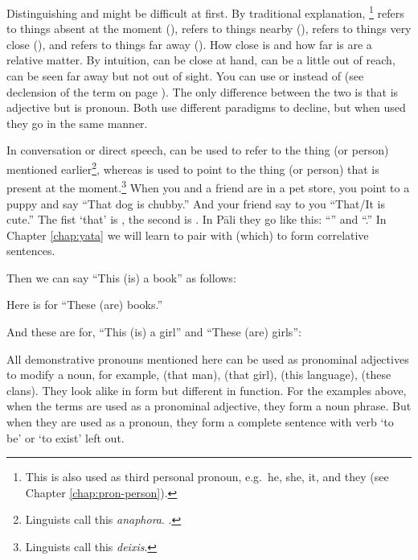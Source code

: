 Distinguishing  and  might be difficult at first. By traditional explanation, \footnote{This is also used as third personal pronoun, e.g.\ he, she, it, and they (see Chapter \ref{chap:pron-person}).} refers to things absent at the moment (),  refers to things nearby (),  refers to things very close (), and  refers to things far away (). How close is  and how far is  are a relative matter. By intuition,  can be close at hand,  can be a little out of reach,  can be seen far away but not out of sight. You can use  or  instead of  (see declension of the term on page \pageref{decl:asuka}). The only difference between the two is that  is adjective but  is pronoun. Both use different paradigms to decline, but when used they go in the same manner.

In conversation or direct speech,  can be used to refer to the thing (or person) mentioned earlier\footnote{Linguists call this \emph{anaphora}. \citealp[See also][p.~29]{warder:intro}.}, whereas  is used to point to the thing (or person) that is present at the moment.\footnote{Linguists call this \emph{deixis}.} When you and a friend are in a pet store, you point to a puppy and say ``That dog is chubby.'' And your friend say to you ``That/It is cute.'' The fist `that' is , the second is . In P\=ali they go like this: ``'' and ``.'' In Chapter \ref{chap:yata} we will learn to pair  with  (which) to form correlative sentences.

Then we can say ``This (is) a book'' as follows:


Here is for ``These (are) books.''


And these are for, ``This (is) a girl'' and ``These (are) girls'':


All demonstrative pronouns mentioned here can be used as pronominal adjectives to modify a noun, for example,  (that man),  (that girl),  (this language),  (these clans). They look alike in form but different in function. For the examples above, when the terms are used as a pronominal adjective, they form a noun phrase. But when they are used as a pronoun, they form a complete sentence with verb `to be' or `to exist' left out.


